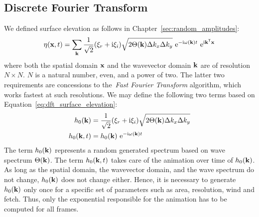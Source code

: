\subsection{Discrete Fourier Transform}
We defined surface elevation as follows in Chapter~\ref{sec:random_amplitudes}:
\begin{equation}
\label{eq:dft_surface_elevation}
\eta(\mathbf{x}, t) = 
\sum_{\mathbf{k}}\frac{1}{\sqrt{2}}(\xi_r+\mathrm{i}\xi_i)
\sqrt{2\Theta(\mathbf{k})\Delta k_x \Delta k_y} 
~\mathrm{e}^{-\mathrm{i}\omega(\mathbf{k})t}
~\mathrm{e}^{\mathrm{i}\mathbf{k}^{\mathsf{T}}\mathbf{x}}
\end{equation}
where both the spatial domain $\mathbf{x}$ and the wavevector domain $\mathbf{k}$ are
of resolution $N \times N$. $N$ is a natural number, even, and a power of two.
The latter two requirements are concessions to the~\emph{Fast Fourier Transform}
algorithm, which works fastest at such resolutions. We may define the following
two terms based on Equation~\ref{eq:dft_surface_elevation}:
\begin{align}
\label{eq:dft_h0}
h_0(\mathbf{k})   &= \frac{1}{\sqrt{2}}(\xi_r+\mathrm{i}\xi_i)\sqrt{2\Theta(\mathbf{k})\Delta k_x \Delta k_y} \\
h_0(\mathbf{k},t) &= h_0(\mathbf{k})~\mathrm{e}^{-\mathrm{i}\omega(\mathbf{k})t}
\end{align}
The term $h_0(\mathbf{k})$ represents a random generated spectrum based on wave
spectrum $\Theta(\mathbf{k})$. The term $h_0(\mathbf{k},t)$ takes care of the
animation over time of $h_0(\mathbf{k})$. As long as the spatial domain,
the wavevector domain, and the wave spectrum do not change, $h_0(\mathbf{k})$
does not change either. Hence, it is necessary to generate $h_0(\mathbf{k})$ only once
for a specific set of parameters such as area, resolution, wind and fetch. Thus,
only the exponential responsible for the animation has to be computed for all
frames.
%
